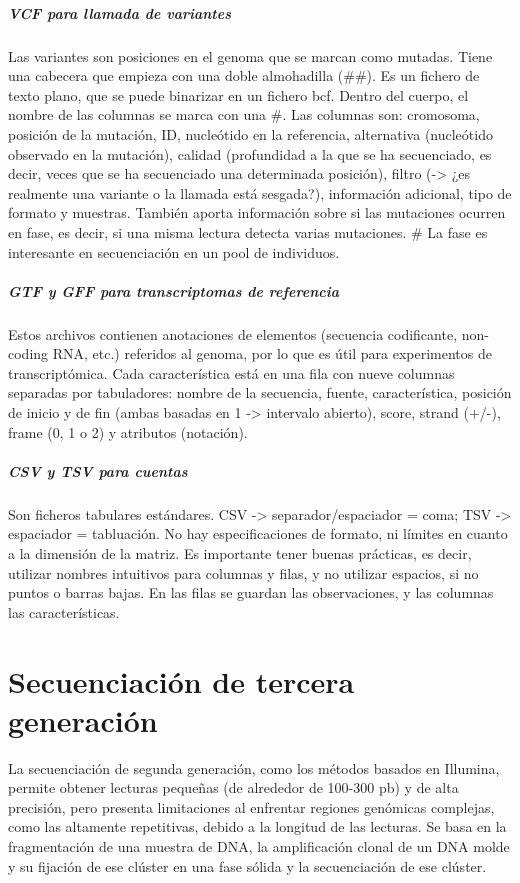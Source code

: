 \paragraph{VCF para llamada de variantes}
Las variantes son posiciones en el genoma que se marcan como mutadas. Tiene una cabecera que empieza con una doble almohadilla (##). Es un fichero de texto plano, que se puede binarizar en un fichero bcf. Dentro del cuerpo, el nombre de las columnas se marca con una #. Las columnas son: cromosoma, posición de la mutación, ID, nucleótido en la referencia, alternativa (nucleótido observado en la mutación), calidad (profundidad a la que se ha secuenciado, es decir, veces que se ha secuenciado una determinada posición), filtro (-> ¿es realmente una variante o la llamada está sesgada?), información adicional, tipo de formato y muestras. También aporta información sobre si las mutaciones ocurren en fase, es decir, si una misma lectura detecta varias mutaciones.
# La fase es interesante en secuenciación en un pool de individuos.

\paragraph{GTF y GFF para transcriptomas de referencia} 
Estos archivos contienen anotaciones de elementos (secuencia codificante, non-coding RNA, etc.) referidos al genoma, por lo que es útil para experimentos de transcriptómica. Cada característica está en una fila con nueve columnas separadas por tabuladores: nombre de la secuencia, fuente, característica, posición de inicio y de fin (ambas basadas en 1 -> intervalo abierto), score, strand (+/-), frame (0, 1 o 2) y atributos (notación). 

\paragraph{CSV y TSV para cuentas}
Son ficheros tabulares estándares. CSV -> separador/espaciador = coma; TSV -> espaciador = tabluación. No hay especificaciones de formato, ni límites en cuanto a la dimensión de la matriz. Es importante tener buenas prácticas, es decir, utilizar nombres intuitivos para columnas y filas, y no utilizar espacios, si no puntos o barras bajas. En las filas se guardan las observaciones, y las columnas las características. 

\chapter{Secuenciación de tercera generación}
La secuenciación de segunda generación, como los métodos basados en Illumina, permite obtener lecturas pequeñas (de alrededor de 100-300 pb) y de alta precisión, pero presenta limitaciones al enfrentar regiones genómicas complejas, como las altamente repetitivas, debido a la longitud de las lecturas. Se basa en la fragmentación de una muestra de DNA, la amplificación clonal de un DNA molde y su fijación de ese clúster en una fase sólida y la secuenciación de ese clúster. 

